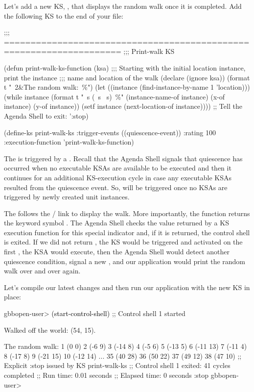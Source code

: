 \documentclass[10pt,twoside,english,pdftex]{article}
\begin{document}
%
%
%
%
Let's add a new KS, , that displays the random walk once
it is completed. Add the following KS to the end of your
 file:
%
\W\supp
\begin{example}
  ;;; ====================================================================
  ;;;   Print-walk KS

  (defun print-walk-ks-function (ksa)
    ;;; Starting with the initial location instance, print the instance 
    ;;; name and location of the walk
    (declare (ignore ksa))
    (format t "~2\&The random walk:~\%")
    (let ((instance (find-instance-by-name 1 'location)))
      (while instance
        (format t "~s (~s ~s)~\%"
                (instance-name-of instance)
                (x-of instance)
                (y-of instance))
        (setf instance (next-location-of instance))))
    ;; Tell the Agenda Shell to exit:
    ':stop)

  (define-ks print-walk-ks
    :trigger-events ((quiescence-event))
    :rating 100
    :execution-function 'print-walk-ks-function)
\end{example}
%
The  is triggered by a .  Recall
that the Agenda Shell signals that quiescence has occurred when no
executable KSAs are available to be executed and then it continues for an
additional KS-execution cycle in case any executable KSAs resulted from the
quiescence event.  So,  will be triggered once no
 KSAs are triggered by newly created  unit
instances.

The  follows the
/ link to display the walk.  More
importantly, the function returns the keyword symbol .  The Agenda
Shell checks the value returned by a KS execution function for this special
indicator and, if it is returned, the control shell is exited.  If we did not
return , the  KS would be triggered and
activated on the first , the KSA would execute, then
the Agenda Shell would detect another quiescence condition, signal a new
, and our application would print the random walk over
and over again.

Let's compile our latest changes and then run our application with the new
 KS in place:
%
\W\supp
\begin{example}
\textcolor{darkergray}{%
  gbbopen-user> \textcolor{black}{(start-control-shell)}
  ;; Control shell 1 started

  Walked off the world: (54, 15).

  The random walk:
  1 (0 0)
  2 (-6 9)
  3 (-14 8)
  4 (-5 6)
  5 (-13 5)
  6 (-11 13)
  7 (-11 4)
  8 (-17 8)
  9 (-21 15)
  10 (-12 14)
       ...
  35 (40 28)
  36 (50 22)
  37 (49 12)
  38 (47 10)
  ;; Explicit :stop issued by KS print-walk-ks
  ;; Control shell 1 exited: 41 cycles completed
  ;; Run time: 0.01 seconds
  ;; Elapsed time: 0 seconds
  :stop
  gbbopen-user>}
\end{example}
\end{document}
